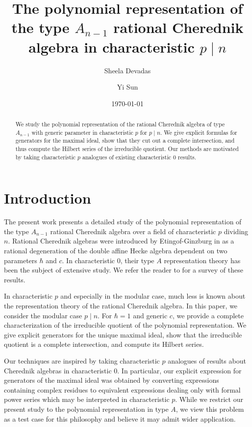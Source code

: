 \documentclass{amsart}
\numberwithin{equation}{section}
\theoremstyle{definition}
\begin{document}
\title[Polynomial representation of type $A_{n - 1}$ rational Cherednik algebra in characteristic $p \mid n$]{The polynomial representation of the type $A_{n - 1}$ rational Cherednik algebra in characteristic $p \mid n$}
\author{Sheela Devadas}
\author{Yi Sun}
\date{\today}

\begin{abstract}
We study the polynomial representation of the rational Cherednik algebra of type $A_{n-1}$ with generic parameter in characteristic $p$ for $p \mid n$. We give explicit formulas for generators for the maximal ideal, show that they cut out a complete intersection, and thus compute the Hilbert series of the irreducible quotient. Our methods are motivated by taking characteristic $p$ analogues of existing characteristic $0$ results.
\end{abstract}

\maketitle
\setcounter{tocdepth}{1}
\tableofcontents

\section{Introduction}

The present work presents a detailed study of the polynomial representation of the type $A_{n - 1}$ rational Cherednik algebra over a field of characteristic $p$ dividing $n$.  Rational Cherednik algebras were introduced by Etingof-Ginzburg in \cite{EG} as a rational degeneration of the double affine Hecke algebra dependent on two parameters $\hbar$ and $c$.  In characteristic $0$, their type $A$ representation theory has been the subject of extensive study.  We refer the reader to \cite{EM} for a survey of these results. 

In characteristic $p$ and especially in the modular case, much less is known about the representation theory of the rational Cherednik algebra.  In this paper, we consider the modular case $p \mid n$.  For $\hbar = 1$ and generic $c$, we provide a complete characterization of the irreducible quotient of the polynomial representation.  We give explicit generators for the unique maximal ideal, show that the irreducible quotient is a complete intersection, and compute its Hilbert series.

Our techniques are inspired by taking characteristic $p$ analogues of results about Cherednik algebras in characteristic $0$.  In particular, our explicit expression for generators of the maximal ideal was obtained by converting expressions containing complex residues to equivalent expressions dealing only with formal power series which may be interpreted in characteristic $p$.  While we restrict our present study to the polynomial representation in type $A$, we view this problem as a test case for this philosophy and believe it may admit wider application.
\end{document}
